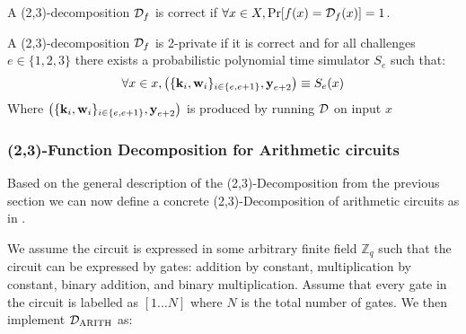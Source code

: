 \begin{definition}[Correctness]
\label{def:decomp_correctness}
A (2,3)-decomposition $\mathcal{D}_{f}$ is correct if
$\forall x \in X, \operatorname{Pr}[f(x) = \mathcal{D}_{f}(x)] = 1$.
\end{definition}

\begin{definition}[Privacy]
\label{def:decomp_privacy}
A (2,3)-decomposition $\mathcal{D}_{f}$ is 2-private if it is correct and for all challenges
$e \in \{1,2,3\}$ there exists a probabilistic polynomial time simulator $S_{e}$
such that:
\[
  \forall x \in x, \left(\{\textbf{k}_{i}, \textbf{w}_{i} \}_{i \in \{e, e+1\}}, \textbf{y}_{e+2} \right)
  \equiv S_{e}(x)
\]
Where $\left(\{\textbf{k}_{i}, \textbf{w}_{i} \}_{i \in \{e, e+1\}}, \textbf{y}_{e+2}
\right)$ is produced by running $\mathcal{D}$ on input $x$
\end{definition}

\subsubsection{(2,3)-Function Decomposition for Arithmetic circuits}
\label{subsec:general:arith}
Based on the general description of the (2,3)-Decomposition from the previous
section we can now define a concrete (2,3)-Decomposition of arithmetic circuits
as in \citet{zkboo}.

We assume the circuit is expressed in some arbitrary finite field
$\mathbb{Z}_{q}$ such that the circuit can be expressed by gates: addition by constant,
multiplication by constant, binary addition, and binary multiplication.
Assume that every gate in the circuit is labelled as $[1 \dots N]$ where $N$ is
the total number of gates.
We then implement $\mathcal{D}_{\text{ARITH}}$ as:

